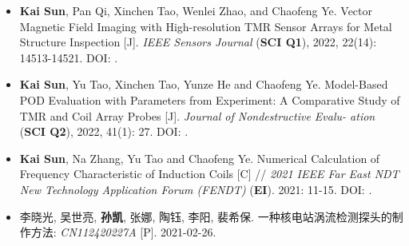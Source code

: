 \ifzh
{}
\begin{itemize}[leftmargin=1.5em]
    \item \textbf{Kai Sun}, Pan Qi, Xinchen Tao, Wenlei Zhao, and Chaofeng Ye. Vector Magnetic Field Imaging with High-resolution TMR Sensor Arrays for Metal Structure Inspection [J]. \textsl{IEEE Sensors Journal} (\textbf{SCI Q1}), 2022, 22(14): 14513-14521. DOI: .
          \\{ \footnotesize {}}

    \item \textbf{Kai Sun}, Yu Tao, Xinchen Tao, Yunze He and Chaofeng Ye. Model-Based POD Evaluation with Parameters from Experiment: A Comparative Study of TMR and Coil Array Probes [J]. \textsl{Journal of Nondestructive Evalu- ation} (\textbf{SCI Q2}), 2022, 41(1): 27. DOI: .
          \\{ \footnotesize {}}

    \item \textbf{Kai Sun}, Na Zhang, Yu Tao and Chaofeng Ye. Numerical Calculation of Frequency Characteristic of Induction Coils [C] // \textsl{2021 IEEE Far East NDT New Technology Application Forum (FENDT)} (\textbf{EI}). 2021: 11-15. DOI: .
          \\{ \footnotesize {}}

    \item 李晓光, 吴世亮, \textbf{孙凯}, 张娜, 陶钰, 李阳, 裴希保. 一种核电站涡流检测探头的制作方法: \textsl{CN112420227A} [P]. 2021-02-26.
\end{itemize}
\else
{}
